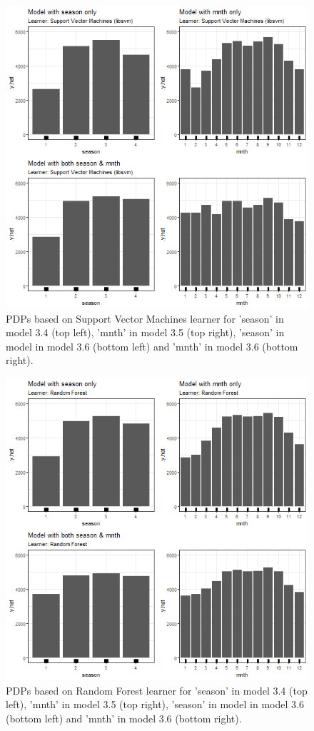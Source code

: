\documentclass[
]{krantz}
\begin{document}
\begin{figure}

{\centering \includegraphics[width=0.8\linewidth]{images/VK_PDP_9_Correlated_categorical_SVM} 

}

\caption{PDPs based on Support Vector Machines learner for 'season' in model 3.4 (top left), 'mnth' in model 3.5 (top right), 'season' in model in model 3.6 (bottom left) and 'mnth' in model 3.6 (bottom right).}\label{fig:Figure09}
\end{figure}

\begin{figure}

{\centering \includegraphics[width=0.8\linewidth]{images/VK_PDP_10_Correlated_categorical_RF} 

}

\caption{PDPs based on Random Forest learner for 'season' in model 3.4 (top left), 'mnth' in model 3.5 (top right), 'season' in model in model 3.6 (bottom left) and 'mnth' in model 3.6 (bottom right).}\label{fig:Figure10}
\end{figure}
\end{document}
